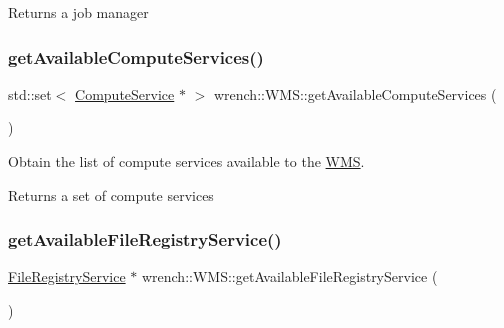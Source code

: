 \begin{DoxyReturn}{Returns}
a job manager 
\end{DoxyReturn}
\mbox{\label{classwrench_1_1_w_m_s_a6a2c05d2a60ce335588a25a1b0b7a8e3}} 
\subsubsection{\texorpdfstring{get\+Available\+Compute\+Services()}{getAvailableComputeServices()}}
{\footnotesize\ttfamily std\+::set$<$ \hyperlink{classwrench_1_1_compute_service}{Compute\+Service} $\ast$ $>$ wrench\+::\+W\+M\+S\+::get\+Available\+Compute\+Services (\begin{DoxyParamCaption}{ }\end{DoxyParamCaption})\hspace{0.3cm}{\ttfamily [protected]}}



Obtain the list of compute services available to the \hyperlink{classwrench_1_1_w_m_s}{W\+MS}. 

\begin{DoxyReturn}{Returns}
a set of compute services 
\end{DoxyReturn}
\mbox{\label{classwrench_1_1_w_m_s_ae97930a7ae7b51c878cce394ff8b6760}} 
\subsubsection{\texorpdfstring{get\+Available\+File\+Registry\+Service()}{getAvailableFileRegistryService()}}
{\footnotesize\ttfamily \hyperlink{classwrench_1_1_file_registry_service}{File\+Registry\+Service} $\ast$ wrench\+::\+W\+M\+S\+::get\+Available\+File\+Registry\+Service (\begin{DoxyParamCaption}{ }\end{DoxyParamCaption})\hspace{0.3cm}{\ttfamily [protected]}}



